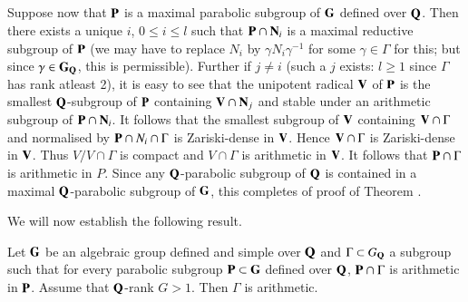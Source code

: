 \subsection{}\label{art9-subsec4.42}
Suppose now that $\mathbf{P}$ is a maximal parabolic subgroup of $\mathbf{G}$ defined over $\mathbf{Q}$. Then there exists a unique $i$, $0 \leqslant i \leqslant l$ such that $\mathbf{P} \cap \mathbf{N}_i$ is a maximal reductive subgroup of $\mathbf{P}$ (we may have to replace $N_i$ by $\gamma N_i \gamma^{-1}$ for some $\gamma \in \Gamma$ for this; but since $\gamma \in \mathbf{G}_{\mathbf{Q}}$, this is permissible). Further if $j \neq i$ (such a $j$ exists: $l \geqslant 1$ since $\Gamma$ has rank atleast 2), it is easy to see that the unipotent radical $\mathbf{V}$ of $\mathbf{P}$ is the smallest $\mathbf{Q}$-subgroup of $\mathbf{P}$ containing $\mathbf{V} \cap \mathbf{N}_j$ and stable under an arithmetic subgroup of $\mathbf{P} \cap \mathbf{N}_i$. It follows that the  smallest subgroup of $\mathbf{V}$ containing $\mathbf{V} \cap \Gamma$ and normalised by $\mathbf{P} \cap N_i \cap \Gamma$ is Zariski-dense in $\mathbf{V}$. Hence $\mathbf{V} \cap \Gamma$ is Zariski-dense in $\mathbf{V}$. Thus $V/V \cap \Gamma$ is compact and $V \cap \Gamma$ is arithmetic in $\mathbf{V}$. It follows that $\mathbf{P} \cap \Gamma$ is arithmetic in $P$. Since any $\mathbf{Q}$-parabolic subgroup of $\mathbf{Q}$ is contained in a maximal $\mathbf{Q}$-parabolic subgroup of $\mathbf{G}$, this completes of proof of Theorem \label{art9-thm4.4}.

We will now establish the following result.

\setcounter{definition}{42}
\begin{theorem}\label{art9-thm4.43}
Let $\mathbf{G}$ be an algebraic group defined and simple over $\mathbf{Q}$ and $\Gamma \subset G_{\mathbf{Q}}$ a subgroup such that for every parabolic subgroup $\mathbf{P} \subset \mathbf{G}$ defined over $\mathbf{Q}$, $\mathbf{P} \cap \Gamma$ is arithmetic in $\mathbf{P}$. Assume that $\mathbf{Q}$-rank $G > 1$. Then $\Gamma$ is arithmetic.
\end{theorem}

